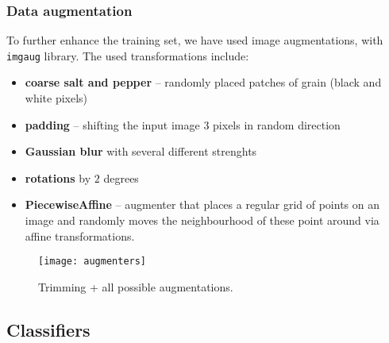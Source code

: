         \subsubsection*{Data augmentation}
        To further enhance the training set, we have used image augmentations, with \texttt{imgaug}\cite{imgaug} library.
        The used transformations include:
        \begin{itemize}
            \item \textbf{coarse salt and pepper} -- randomly placed patches of grain (black and white pixels)
            \item \textbf{padding} -- shifting the input image $3$ pixels in random direction
            \item \textbf{Gaussian blur} with several different strenghts
            \item \textbf{rotations} by $2$ degrees
            \item \textbf{PiecewiseAffine} -- augmenter that places a regular grid of points on an image and randomly moves the neighbourhood of these point around via affine transformations.
        \end{itemize}
        \begin{figure}[H]
        \caption{Trimming + all possible augmentations.}
        \centering
        \texttt{[image: augmenters]}
        \end{figure}

    \subsection{Classifiers}
